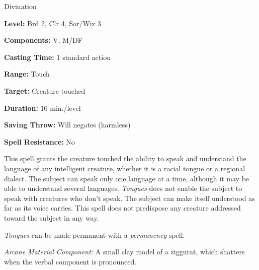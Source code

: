 
Divination

\textbf{Level:} Brd 2, Clr 4, Sor/Wiz 3

\textbf{Components:} V, M/DF

\textbf{Casting Time:} 1 standard action

\textbf{Range:} Touch

\textbf{Target:} Creature touched

\textbf{Duration:} 10 min./level

\textbf{Saving Throw:} Will negates (harmless)

\textbf{Spell Resistance:} No

This spell grants the creature touched the ability to speak and understand the 
language of any intelligent creature, whether it is a racial tongue or a regional 
dialect. The subject can speak only one language at a time, although it may be 
able to understand several languages. \textit{Tongues} does not enable the subject 
to speak with creatures who don't speak. The subject can make itself understood 
as far as its voice carries. This spell does not predispose any creature addressed 
toward the subject in any way.

\textit{Tongues} can be made permanent with a \textit{permanency} spell.

\textit{Arcane Material Component:} A small clay model of a ziggurat, which shatters 
when the verbal component is pronounced.

